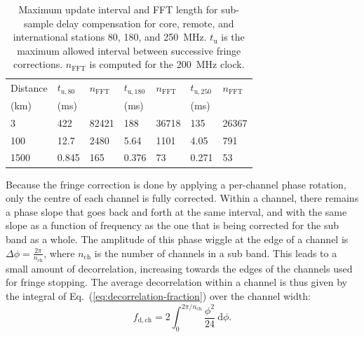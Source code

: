 \documentclass[a4paper,twoside]{article}
\begin{document}
\begin{table}
\caption{Maximum update interval and FFT length for sub-sample delay
  compensation for core, remote, and international stations 80, 180,
  and 250~MHz. $t_\mathrm{u}$ is the maximum allowed interval between
  successive fringe corrections. $n_\mathrm{FFT}$ is computed for the
  200~MHz clock.}
\label{tab:delay-update-intervals}
\begin{center}
\begin{tabular}{l|ll|ll|ll}
\hline
\hline
Distance &  $t_\mathrm{u,80}$ & $n_\mathrm{FFT}$ & $t_\mathrm{u,180}$ & $n_\mathrm{FFT}$& $t_\mathrm{u,250}$ & $n_\mathrm{FFT}$\\
 (km)    &  (ms)             &                 & (ms)             &                & (ms)              & \\
\hline
3        &  422              & 82421           & 188              &  36718         & 135               & 26367\\
100      &   12.7            &  2480           &  5.64            &   1101         &   4.05            &   791\\
1500     &     0.845         &   165           &  0.376           &     73         &   0.271           &    53\\
\hline
\hline
\end{tabular}
\end{center}
\end{table}





Because the fringe correction is done by applying a per-channel phase
rotation, only the centre of each channel is fully corrected. Within a
channel, there remains a phase slope that goes back and forth at the
same interval, and with the same slope as a function of frequency as
the one that is being corrected for the sub band as a whole. The
amplitude of this phase wiggle at the edge of a channel is $\Delta\phi
= \frac{2\pi}{n_\mathrm{ch}}$, where $n_\mathrm{ch}$ is the number of
channels in a sub band. This leads to a small amount of decorrelation,
increasing towards the edges of the channels used for fringe
stopping. The average decorrelation within a channel is thus given by
the integral of Eq.~(\ref{eq:decorrelation-fraction}) over the channel
width:
\begin{equation}
f_\mathrm{d,ch} = 2\int_0^{2\pi/n_\mathrm{ch}} \frac{\phi^2}{24}\ \mathrm{d}\phi.
\end{equation}
\end{document}
